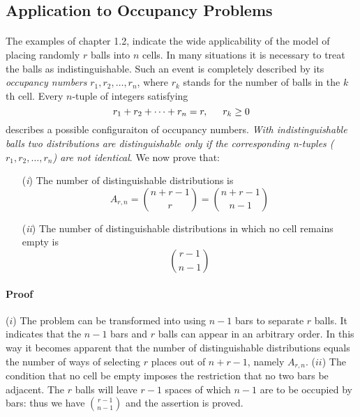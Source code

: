 \documentclass{article}
\numberwithin{equation}{subsection}
\begin{document}
		\subsection{Application to Occupancy Problems} 
			\paragraph{} The examples of chapter 1.2, indicate the wide applicability of the model of placing randomly $r$ balls into $n$ cells. In many situations it is necessary to treat the balls as indistinguishable. Such an event is completely described by its \textit{occupancy numbers} $r_1,r_2,\dots,r_n$, where $r_k$ stands for the number of balls in the $k$th cell. Every $n$-tuple of integers satisfying
			\begin{equation}
				\label{eq:2.5.1}
				r_1+r_2+\cdots+r_n=r,\indent r_k\geq 0
			\end{equation}
			describes a possible configuraiton of occupancy numbers.\textit{ With indistinguishable balls two distributions are distinguishable only if the corresponding n-tuples ($r_1, r_2,\dots, r_n$) are not identical}. We now prove that:
			\begin{enumerate}
			\item[(\textit{i})] The number of distinguishable distributions is
			\begin{equation}
				A_{r,n} = {n+r-1\choose r} = {n+r-1\choose n-1}
			\end{equation}
			\item[(\textit{ii})] The number of distinguishable distributions in which no cell remains empty is 
			\begin{equation}
				\label{eq:2.5.3}
				{r-1\choose n-1}
			\end{equation}
	
			\end{enumerate}
			\paragraph{Proof} ($i$) The problem can be transformed into using $n-1$ bars to separate $r$ balls. It indicates that the $n-1$ bars and $r$ balls can appear in an arbitrary order. In this way it becomes apparent that the number of distinguishable distributions equals the number of ways of selecting $r$ places out of $n+r-1$, namely $A_{r,n}$. ($ii$) The condition that no cell be empty imposes the restriction that no two bars be adjacent. The $r$ balls will leave $r-1$ spaces of which $n-1$ are to be occupied by bars: thus we have $r-1 \choose n-1$ and the assertion is proved.
\end{document}
